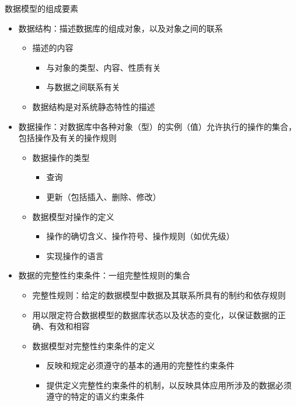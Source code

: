 数据模型的组成要素
\begin{itemize}
    \item 数据结构：描述数据库的组成对象，以及对象之间的联系
    \begin{itemize}
        \item 描述的内容
        \begin{itemize}
            \item 与对象的类型、内容、性质有关
            \item 与数据之间联系有关
        \end{itemize}
        \item 数据结构是对系统静态特性的描述
    \end{itemize}
    \item 数据操作：对数据库中各种对象（型）的实例（值）允许执行的操作的集合，包括操作及有关的操作规则
    \begin{itemize}
        \item 数据操作的类型
        \vspace{-0.8em}
	    \begin{multicols}{2}
        \begin{itemize}
            \item 查询
            \item 更新（包括插入、删除、修改）
        \end{itemize}
	    \end{multicols}
	    \vspace{-1em}
        \item 数据模型对操作的定义
        \begin{itemize}
            \item 操作的确切含义、操作符号、操作规则（如优先级）
            \item 实现操作的语言
        \end{itemize}
    \end{itemize}
    \item 数据的完整性约束条件：一组完整性规则的集合
    \begin{itemize}
        \item 完整性规则：给定的数据模型中数据及其联系所具有的制约和依存规则
        \item 用以限定符合数据模型的数据库状态以及状态的变化，以保证数据的正确、有效和相容
        \item 数据模型对完整性约束条件的定义
        \begin{itemize}
            \item 反映和规定必须遵守的基本的通用的完整性约束条件
            \item 提供定义完整性约束条件的机制，以反映具体应用所涉及的数据必须遵守的特定的语义约束条件
        \end{itemize}
    \end{itemize}
\end{itemize}

